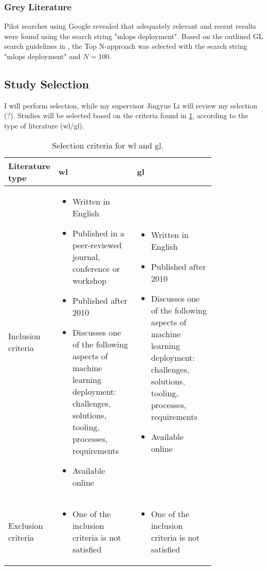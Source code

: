 \subsubsection{Grey Literature}
Pilot searches using Google revealed that adequately relevant and recent results were found using the search string "mlops deployment".
Based on the outlined GL search guidelines in \cite{Garousi2016}, the Top N-approach was selected with the search string "mlops deployment" and $N=100$.

\subsection{Study Selection}
I will perform selection, while my supervisor Jingyue Li will review my selection (?).
Studies will be selected based on the criteria found in \cref{tab:selection_criteria}, according to the type of literature (\acrshort{wl}/\acrshort{gl}).
\begin{table}[h]
    \centering
    \begin{tabular}{l|p{0.4\linewidth}|p{0.4\linewidth}}
         Literature type & \acrshort{wl} & \acrshort{gl}  \\
         \hline
        Inclusion criteria & \begin{itemize}
    \item Written in English
    \item Published in a peer-reviewed journal, conference or workshop
    \item Published after 2010
    \item Discusses one of the following aspects of machine learning deployment: challenges, solutions, tooling, processes, requirements
    \item Available online
\end{itemize} & \begin{itemize}
    \item Written in English
    \item Published after 2010
    \item Discusses one of the following aspects of machine learning deployment: challenges, solutions, tooling, processes, requirements
    \item Available online
\end{itemize} \\
         Exclusion criteria & \begin{itemize}
             \item One of the inclusion criteria is not satisfied
         \end{itemize}  & \begin{itemize}
             \item One of the inclusion criteria is not satisfied
         \end{itemize} \\
    \end{tabular}
    \caption{Selection criteria for \acrfull{wl} and \acrfull{gl}.}
    \label{tab:selection_criteria}
\end{table}


